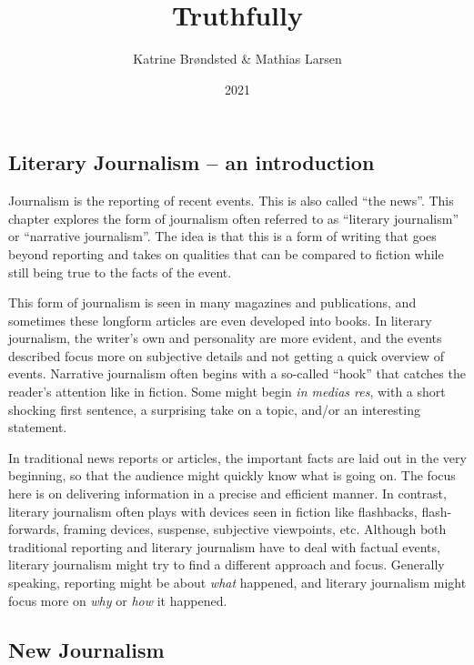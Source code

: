 \documentclass[10pt,a4paper]{article}
\newcommand{\glos}[3]{\dotuline{#1}\marginpar{\scriptsize\textit{#3} #2}}
\begin{document}
  \title{Truthfully}
\date{2021}
\author{Katrine Brøndsted \& Mathias Larsen}
\maketitle
    
\thispagestyle{plain}
\setcounter{page}{1}
\linenumbers

\subsection{Literary Journalism -- an introduction}

Journalism is the reporting of recent events. This is also called ``the news''. This chapter explores the form of journalism often referred to as ``literary journalism'' or ``narrative journalism''. The idea is that this is a form of writing that goes beyond reporting and takes on qualities that can be compared to fiction while still being true to the facts of the event.

This form of journalism is seen in many magazines and publications, and sometimes these longform articles are even developed into books. In literary journalism, the writer's own \glos{humanity}{menneskelighed}{n.} and personality are more evident, and the events described focus more on subjective details and not getting a quick overview of events. Narrative journalism often begins with a so-called ``hook'' that catches the reader's attention like in fiction. Some might begin \textit{in medias res}, with a short shocking first sentence, a surprising take on a topic, and/or an interesting statement.

In traditional news reports or articles, the important facts are laid out in the very beginning, so that the audience might quickly know what is going on. The focus here is on delivering information in a precise and efficient manner. In contrast, literary journalism often plays with devices seen in fiction like flashbacks, flash-forwards, framing devices, suspense, subjective viewpoints, etc. Although both traditional reporting and literary journalism have to deal with factual events, literary journalism might try to find a different approach and focus. Generally speaking, reporting might be about \textit{what} happened, and literary journalism might focus more on \textit{why} or \textit{how} it happened.

\subsection{New Journalism}
\end{document}
